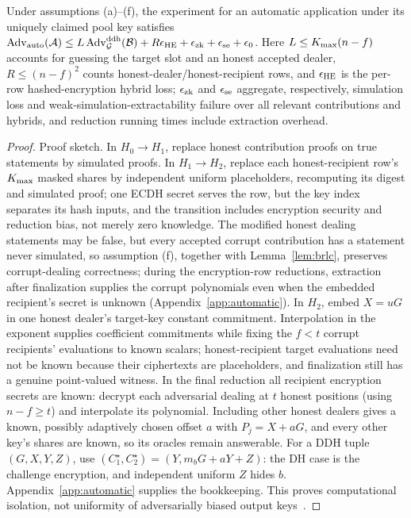\begin{theorem}
\label{thm:automatic}
Under assumptions (a)--(f), the experiment for an automatic application under its uniquely claimed pool key satisfies
{  $\operatorname{Adv}_{\rm auto}(\mathcal{A})\le L\operatorname{Adv}^{\rm ddh}_{\mathcal{G}}(\mathcal{B})+R\epsilon_{\rm HE}+\epsilon_{\rm zk}+\epsilon_{\rm se}+\epsilon_0$}.
Here $L\le K_{\max}(n-f)$ accounts for guessing the target slot and an honest accepted dealer, $R\le(n-f)^2$ counts honest-dealer/honest-recipient rows, and $\epsilon_{\rm HE}$ is the per-row hashed-encryption hybrid loss; $\epsilon_{\rm zk}$ and $\epsilon_{\rm se}$ aggregate, respectively, simulation loss and weak-simulation-extractability failure over all relevant contributions and hybrids, and reduction running times include extraction overhead.
\end{theorem}
\begin{proof}
Proof sketch.
In $H_0\!\to H_1$, replace honest contribution proofs on true statements by simulated proofs. In $H_1\!\to H_2$, replace each honest-recipient row's $K_{\max}$ masked shares by independent uniform placeholders, recomputing its digest and simulated proof; one ECDH secret serves the row, but the key index separates its hash inputs, and the transition includes encryption security and reduction bias, not merely zero knowledge. The modified honest dealing statements may be false, but every accepted corrupt contribution has a statement never simulated, so assumption (f), together with Lemma~\ref{lem:brlc}, preserves corrupt-dealing correctness; during the encryption-row reductions, extraction after finalization supplies the corrupt polynomials even when the embedded recipient's secret is unknown (Appendix~\ref{app:automatic}). In $H_2$, embed $X=uG$ in one honest dealer's target-key constant commitment. Interpolation in the exponent supplies coefficient commitments while fixing the $f<t$ corrupt recipients' evaluations to known scalars; honest-recipient target evaluations need not be known because their ciphertexts are placeholders, and finalization still has a genuine point-valued witness. In the final reduction all recipient encryption secrets are known: decrypt each adversarial dealing at $t$ honest positions (using $n-f\ge t$) and interpolate its polynomial. Including other honest dealers gives a known, possibly adaptively chosen offset $a$ with $P_j=X+aG$, and every other key's shares are known, so its oracles remain answerable. For a DDH tuple $(G,X,Y,Z)$, use $(C_1^\star,C_2^\star)=(Y,m_bG+aY+Z)$: the DH case is the challenge encryption, and independent uniform $Z$ hides $b$. Appendix~\ref{app:automatic} supplies the bookkeeping. This proves computational isolation, not uniformity of adversarially biased output keys~\cite{gennaro1999secure}.
\end{proof}


